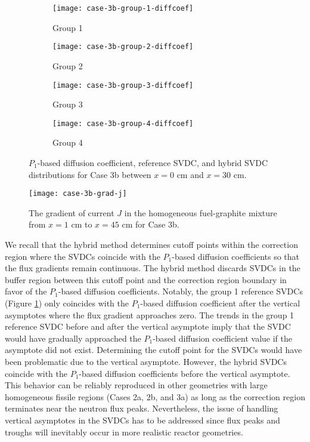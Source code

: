 \begin{figure}[htb!]
  \centering
  \begin{subfigure}[t]{.49\textwidth}
    \centering
    \texttt{[image: case-3b-group-1-diffcoef]}
    \caption{Group 1}
    \label{fig:c3bg1dc}
  \end{subfigure}
  \hfill
  \begin{subfigure}[t]{.49\textwidth}
    \centering
    \texttt{[image: case-3b-group-2-diffcoef]}
    \caption{Group 2}
    \label{fig:c3bg2dc}
  \end{subfigure}
  \begin{subfigure}[t]{.49\textwidth}
    \centering
    \texttt{[image: case-3b-group-3-diffcoef]}
    \caption{Group 3}
    \label{fig:c3bg3dc}
  \end{subfigure}
  \hfill
  \begin{subfigure}[t]{.49\textwidth}
    \centering
    \texttt{[image: case-3b-group-4-diffcoef]}
    \caption{Group 4}
    \label{fig:c3bg4dc}
  \end{subfigure}
  \caption{$P_1$-based diffusion coefficient, reference \gls{SVDC}, and hybrid \gls{SVDC}
    distributions for Case 3b between $x=0$ cm and $x=30$ cm.}
  \label{fig:c3bdiffcoef}
\end{figure}
%
\begin{figure}[htb!]
  \centering
  \texttt{[image: case-3b-grad-j]}
  \caption{The gradient of current $J$ in the homogeneous fuel-graphite mixture from $x=1$ cm to
  $x=45$ cm for Case 3b.}
  \label{fig:c3bgradj}
\end{figure}

We recall that the hybrid method determines cutoff points within the correction region where the
\glspl{SVDC} coincide with the $P_1$-based diffusion coefficients so that the flux gradients
remain continuous. The hybrid method discards \glspl{SVDC} in the buffer region between this
cutoff point and the correction region boundary in favor of the $P_1$-based diffusion coefficients.
Notably, the group 1 reference \glspl{SVDC} (Figure \ref{fig:c3bg1dc}) only coincides
with the $P_1$-based diffusion coefficient after the vertical asymptotes where the flux
gradient approaches zero. The trends in the group 1 reference \gls{SVDC} before and after the
vertical asymptote imply that the \gls{SVDC} would have gradually approached the $P_1$-based
diffusion coefficient value if the asymptote did not exist. Determining the cutoff point for the
\glspl{SVDC} would have been problematic due to the vertical asymptote. However, the hybrid
\glspl{SVDC} coincide with the $P_1$-based diffusion coefficients before the vertical asymptote.
This behavior can be reliably reproduced in other geometries with large homogeneous fissile regions
(Cases 2a, 2b, and 3a) as long as the correction region terminates near the neutron flux peaks.
Nevertheless, the issue of handling vertical asymptotes in the \glspl{SVDC} has to be addressed
since flux peaks and troughs will inevitably occur in more realistic reactor geometries.

